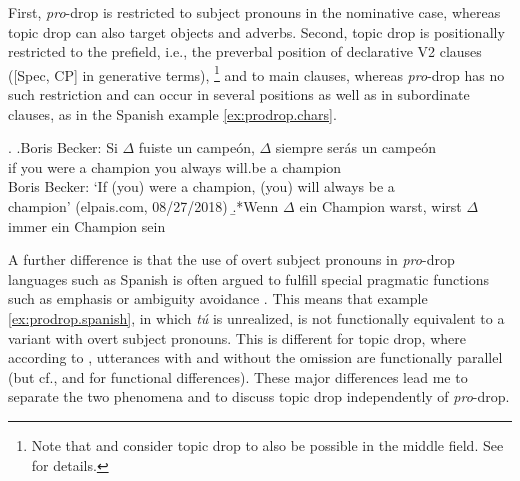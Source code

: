 First, \textit{pro}-drop is restricted to subject pronouns in the nominative case,  whereas topic drop can also target objects and adverbs. 
Second, topic drop is positionally restricted to the prefield, i.e., the preverbal position of declarative V2 clauses ([Spec, CP] in generative terms),%
\footnote{Note that \citet{nygard2014} and \citet{helmer2016} consider topic drop to also be possible in the middle field. 
See  for details.}
%
and to main clauses, whereas \textit{pro}-drop has no such restriction and can occur in several positions as well as in subordinate clauses, as in the Spanish  example \ref{ex:prodrop.chars}.

\ex.\label{ex:prodrop.chars}
\ag.\label{ex:prodrop.spanish}{Boris Becker:} Si $\Delta$ fuiste un campeón, $\Delta$ siempre serás un \phantom{Boris Becker:} campeón \\
{} if you were a champion you always will.be a \phantom{Boris Becker:} champion\\
Boris Becker: `If (you) were a champion, (you) will always be a \\\phantom{Boris~Becker:} champion'  (elpais.com, 08/27/2018)\footnotemark
\b.*\label{ex:prodrop:german}Wenn $\Delta$ ein Champion warst, wirst $\Delta$ immer ein Champion sein


A further difference is that the use of overt subject pronouns in \textit{pro}-drop languages such as Spanish  is often argued to fulfill special pragmatic functions such as emphasis or ambiguity avoidance  \citep{davidson1996,peskova2013}.
This means that example \ref{ex:prodrop.spanish}, in which \textit{tú} is unrealized, is not functionally equivalent to a variant with overt subject pronouns.
This is different for topic drop, where according to \citet[218]{reis2000}, utterances with and without the omission are functionally parallel (but cf., \cite{eckert1998.diss} and \cite{helmer2016} for functional differences).
These major differences lead me to separate the two phenomena and to discuss topic drop independently of \textit{pro}-drop.

